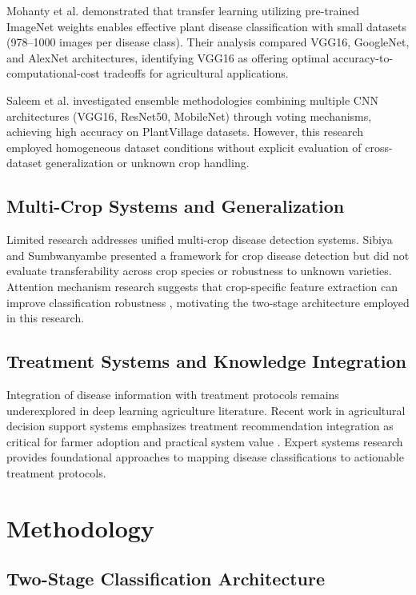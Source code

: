 \documentclass[conference]{IEEEtran}
\begin{document}
Mohanty et al. \cite{ref03} demonstrated that transfer learning utilizing pre-trained ImageNet weights enables effective plant disease classification with small datasets (978--1000 images per disease class). Their analysis compared VGG16, GoogleNet, and AlexNet architectures, identifying VGG16 as offering optimal accuracy-to-computational-cost tradeoffs for agricultural applications.

Saleem et al. \cite{ref04} investigated ensemble methodologies combining multiple CNN architectures (VGG16, ResNet50, MobileNet) through voting mechanisms, achieving high accuracy on PlantVillage datasets. However, this research employed homogeneous dataset conditions without explicit evaluation of cross-dataset generalization or unknown crop handling.

\subsection{Multi-Crop Systems and Generalization}

Limited research addresses unified multi-crop disease detection systems. Sibiya and Sumbwanyambe \cite{ref05} presented a framework for crop disease detection but did not evaluate transferability across crop species or robustness to unknown varieties. Attention mechanism research suggests that crop-specific feature extraction can improve classification robustness \cite{ref06}, motivating the two-stage architecture employed in this research.

\subsection{Treatment Systems and Knowledge Integration}

Integration of disease information with treatment protocols remains underexplored in deep learning agriculture literature. Recent work in agricultural decision support systems emphasizes treatment recommendation integration as critical for farmer adoption and practical system value \cite{ref07}. Expert systems research provides foundational approaches to mapping disease classifications to actionable treatment protocols.

\section{Methodology}

\subsection{Two-Stage Classification Architecture}
\end{document}

